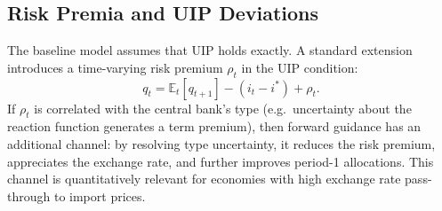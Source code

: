\subsection{Risk Premia and UIP Deviations}
\label{sec:riskpremia}

The baseline model assumes that UIP holds exactly. A standard extension introduces a
time-varying risk premium $\rho_t$ in the UIP condition:
\begin{equation}
  q_t = \mathbb{E}_t[q_{t+1}] - (i_t - i^*) + \rho_t.
\end{equation}
If $\rho_t$ is correlated with the central bank's type (e.g.\ uncertainty about the
reaction function generates a term premium), then forward guidance has an additional
channel: by resolving type uncertainty, it reduces the risk premium, appreciates the
exchange rate, and further improves period-1 allocations. This channel is
quantitatively relevant for economies with high exchange rate pass-through to import
prices.
